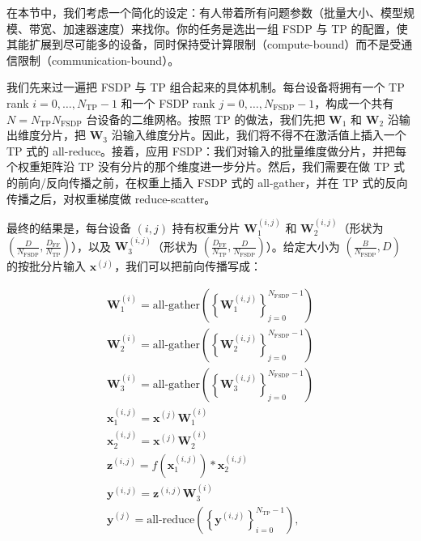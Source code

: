 在本节中，我们考虑一个简化的设定：有人带着所有问题参数（批量大小、模型规模、带宽、加速器速度）来找你。你的任务是选出一组 FSDP 与 TP 的配置，使其能扩展到尽可能多的设备，同时保持受计算限制（compute-bound）而不是受通信限制（communication-bound）。

我们先来过一遍把 FSDP 与 TP 组合起来的具体机制。每台设备将拥有一个 TP rank $i=0,\ldots,N_{\mathrm{TP}}-1$ 和一个 FSDP rank $j=0,\ldots,N_{\mathrm{FSDP}}-1$，构成一个共有 $N=N_{\mathrm{TP}}N_{\mathrm{FSDP}}$ 台设备的二维网格。按照 TP 的做法，我们先把 $\boldsymbol{W}_1$ 和 $\boldsymbol{W}_2$ 沿输出维度分片，把 $\boldsymbol{W}_3$ 沿输入维度分片。因此，我们将不得不在激活值上插入一个 TP 式的 all-reduce。接着，应用 FSDP：我们对输入的批量维度做分片，并把每个权重矩阵沿 TP 没有分片的那个维度进一步分片。然后，我们需要在做 TP 式的前向/反向传播之前，在权重上插入 FSDP 式的 all-gather，并在 TP 式的反向传播之后，对权重梯度做 reduce-scatter。

最终的结果是，每台设备 $(i,j)$ 持有权重分片 $\boldsymbol{W}_1^{(i,j)}$ 和 $\boldsymbol{W}_2^{(i,j)}$（形状为 $\left(\frac{D}{N_{\mathrm{FSDP}}},\frac{D_{\mathrm{FF}}}{N_{\mathrm{TP}}}\right)$），以及 $\boldsymbol{W}_3^{(i,j)}$（形状为 $\left(\frac{D_{\mathrm{FF}}}{N_{\mathrm{TP}}},\frac{D}{N_{\mathrm{FSDP}}}\right)$）。给定大小为 $\left(\frac{B}{N_{\mathrm{FSDP}}},D\right)$ 的按批分片输入 $\boldsymbol{x}^{(j)}$，我们可以把前向传播写成：

\begin{gather}
\boldsymbol{W}_1^{(i)} = \text{all-gather}\left(\left\{\boldsymbol{W}_1^{(i,j)}\right\}_{j=0}^{N_{\mathrm{FSDP}}-1}\right) \tag{52}\\
\boldsymbol{W}_2^{(i)} = \text{all-gather}\left(\left\{\boldsymbol{W}_2^{(i,j)}\right\}_{j=0}^{N_{\mathrm{FSDP}}-1}\right) \tag{53}\\
\boldsymbol{W}_3^{(i)} = \text{all-gather}\left(\left\{\boldsymbol{W}_3^{(i,j)}\right\}_{j=0}^{N_{\mathrm{FSDP}}-1}\right) \tag{54}\\
\boldsymbol{x}_1^{(i,j)} = \boldsymbol{x}^{(j)}\boldsymbol{W}_1^{(i)} \tag{55}\\
\boldsymbol{x}_2^{(i,j)} = \boldsymbol{x}^{(j)}\boldsymbol{W}_2^{(i)} \tag{56}\\
\boldsymbol{z}^{(i,j)} = f\left(\boldsymbol{x}_1^{(i,j)}\right) * \boldsymbol{x}_2^{(i,j)} \tag{57}\\
\boldsymbol{y}^{(i,j)} = \boldsymbol{z}^{(i,j)}\boldsymbol{W}_3^{(i)} \tag{58}\\
\boldsymbol{y}^{(j)} = \text{all-reduce}\left(\left\{\boldsymbol{y}^{(i,j)}\right\}_{i=0}^{N_{\mathrm{TP}}-1}\right), \tag{59}
\end{gather}

